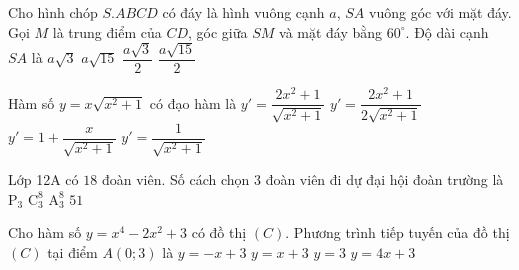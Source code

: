 \begin{ex}%
Cho hình chóp $S.ABCD$ có đáy là hình vuông cạnh $a$, $SA$ vuông góc với mặt đáy. Gọi $M$ là trung điểm của $CD$, góc giữa $SM$ và mặt đáy bằng $60^\circ$. Độ dài cạnh $SA$ là
\choice
{$a\sqrt{3}$}
{$a\sqrt{15}$}
{$\dfrac{a\sqrt{3}}{2}$}
{\True $\dfrac{a\sqrt{15}}{2}$}
\end{ex}

\begin{ex}%
Hàm số $y=x\sqrt{x^2+1}$ có đạo hàm là
\choice
{\True $y'=\dfrac{2x^2+1}{\sqrt{x^2+1}}$}
{$y'=\dfrac{2x^2+1}{2\sqrt{x^2+1}}$}
{$y'=1+\dfrac{x}{\sqrt{x^2+1}}$}
{$y'=\dfrac{1}{\sqrt{x^2+1}}$}
\end{ex}

\begin{ex}%
Lớp 12A có $18$ đoàn viên. Số cách chọn $3$ đoàn viên đi dự đại hội đoàn trường là
\choice
{$\mathrm{P}_3$}
{\True $\mathrm{C}_3^8$}
{$\mathrm{A}_3^8$}
{$51$}
\end{ex}

\begin{ex}%
Cho hàm số $y=x^4-2x^2+3$ có đồ thị $(C)$. Phương trình tiếp tuyến của đồ thị $(C)$ tại điểm $A(0;3)$ là
\choice
{$y=-x+3$}
{$y=x+3$}
{\True $y=3$}
{$y=4x+3$}
\end{ex}

